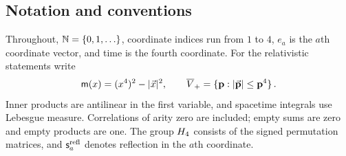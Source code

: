 \subsection{Notation and conventions}\label{sec:conventions}

Throughout, $\mathbb{N}=\{0,1,\ldots\}$, coordinate indices run from $1$ to $4$, $e_a$ is the $a$th coordinate vector, and time is the fourth coordinate. For the relativistic statements write
\begin{equation*}
\mathsf{m}(x)=(x^4)^2-|\vec x|^2,\qquad
\overline{V}_+=\{\mathbf p:|\vec{\mathbf p}|\le\mathbf p^4\}\,.
\end{equation*}
Inner products are antilinear in the first variable, and spacetime integrals use Lebesgue measure. Correlations of arity zero are included; empty sums are zero and empty products are one. The group $H_4$ consists of the signed permutation matrices, and $\mathsf s_a^{\rm refl}$ denotes reflection in the $a$th coordinate.
